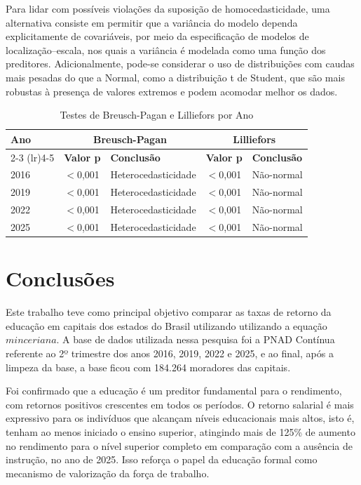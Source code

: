 \documentclass[12pt,a4paper,header]{abnt}
\begin{document}
Para lidar com possíveis violações da suposição de homocedasticidade, uma alternativa consiste em permitir que a variância do modelo dependa explicitamente de covariáveis, por meio da especificação de modelos de localização–escala, nos quais a variância é modelada como uma função dos preditores. Adicionalmente, pode-se considerar o uso de distribuições com caudas mais pesadas do que a Normal, como a distribuição t de Student, que são mais robustas à presença de valores extremos e podem acomodar melhor os dados.
\FloatBarrier
\begin{table}[ht]
\centering
\caption{Testes de Breusch-Pagan e Lilliefors por Ano}
\label{tab:testes_bp_lillie}
\begin{tabular}{lllll}
\toprule
\multirow{2}{*}{\textbf{Ano}} & \multicolumn{2}{c}{\textbf{Breusch-Pagan}} & \multicolumn{2}{c}{\textbf{Lilliefors}} \\
\cmidrule(lr){2-3} \cmidrule(lr){4-5}
& \textbf{Valor p} & \textbf{Conclusão} & \textbf{Valor p} & \textbf{Conclusão} \\
\midrule
2016 & $<$0,001 & Heterocedasticidade & $<$0,001 & Não-normal \\
2019 & $<$0,001 & Heterocedasticidade & $<$0,001 & Não-normal \\
2022 & $<$0,001 & Heterocedasticidade & $<$0,001 & Não-normal \\
2025 & $<$0,001 & Heterocedasticidade & $<$0,001 & Não-normal \\
\bottomrule
\end{tabular}
\end{table}


\chapter{Conclusões} \label{cap:conclusao}

Este trabalho teve como principal objetivo comparar as taxas de retorno da educação em capitais dos estados do Brasil utilizando utilizando a equação $minceriana$. A base de dados utilizada nessa pesquisa foi a PNAD Contínua referente ao 2º trimestre dos anos 2016, 2019, 2022 e 2025, e ao final, após a limpeza da base, a base ficou com 184.264 moradores das capitais.

Foi confirmado que a educação é um preditor fundamental para o rendimento, com retornos positivos crescentes em todos os períodos. O retorno salarial é mais expressivo para os indivíduos que alcançam níveis educacionais mais altos, isto é, tenham ao menos iniciado o ensino superior, atingindo mais de 125\% de aumento no rendimento para o nível superior completo em comparação com a ausência de instrução, no ano de 2025. Isso reforça o papel da educação formal como mecanismo de valorização da força de trabalho.
\end{document}
